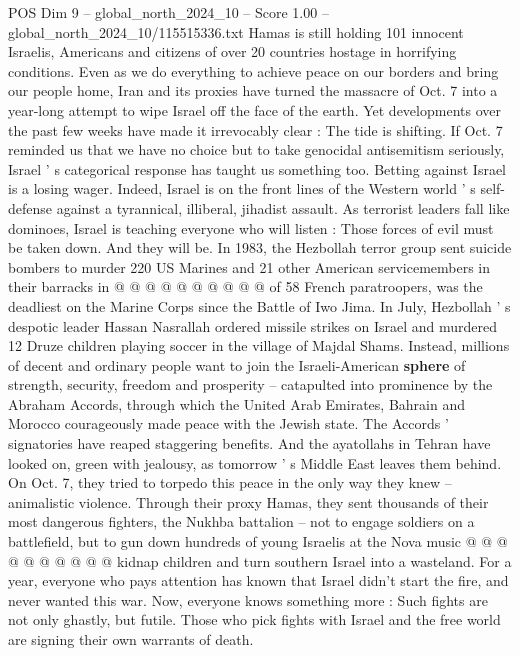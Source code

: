 \begin{textsample}{POS Dim 9 – global\_north\_2024\_10 – Score 1.00 – global\_north\_2024\_10/115515336.txt}  \label{ex:f9_pos_224}
Hamas is still holding 101 innocent Israelis, Americans and citizens of over 20 countries hostage in horrifying conditions.
Even as we do everything to achieve peace on our borders and bring our people home, Iran and its proxies have turned the massacre of Oct. 7 into a year-long attempt to wipe Israel off the face of the earth.
Yet developments over the past few weeks have made it irrevocably clear : The tide is shifting.
If Oct. 7 reminded us that we have no choice but to take genocidal antisemitism seriously, Israel ' s categorical response has taught us something too.
Betting against Israel is a losing wager.
Indeed, Israel is on the front lines of the Western world ' s self-defense against a tyrannical, illiberal, jihadist assault.
As terrorist leaders fall like dominoes, Israel is teaching everyone who will listen : Those forces of evil must be taken down.
And they will be.
In 1983, the Hezbollah terror group sent suicide bombers to murder 220 US Marines and 21 other American servicemembers in their barracks in @ @ @ @ @ @ @ @ @ @ of 58 French paratroopers, was the deadliest on the Marine Corps since the Battle of Iwo Jima.
In July, Hezbollah ' s despotic leader Hassan Nasrallah ordered missile strikes on Israel and murdered 12 Druze children playing soccer in the village of Majdal Shams.
Instead, millions of decent and ordinary people want to join the Israeli-American \textbf{sphere} of strength, security, freedom and prosperity -- catapulted into prominence by the Abraham Accords, through which the United Arab Emirates, Bahrain and Morocco courageously made peace with the Jewish state.
The Accords ' signatories have reaped staggering benefits.
And the ayatollahs in Tehran have looked on, green with jealousy, as tomorrow ' s Middle East leaves them behind.
On Oct. 7, they tried to torpedo this peace in the only way they knew -- animalistic violence.
Through their proxy Hamas, they sent thousands of their most dangerous fighters, the Nukhba battalion -- not to engage soldiers on a battlefield, but to gun down hundreds of young Israelis at the Nova music @ @ @ @ @ @ @ @ @ @ kidnap children and turn southern Israel into a wasteland.
For a year, everyone who pays attention has known that Israel didn't start the fire, and never wanted this war.
Now, everyone knows something more : Such fights are not only ghastly, but futile.
Those who pick fights with Israel and the free world are signing their own warrants of death.

\end{textsample}
